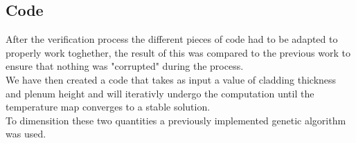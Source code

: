 \subsection{Code}
After the verification process the different pieces of code had to be adapted to properly work toghether, 
the result of this was compared to the previous work to ensure that nothing was "corrupted" during the process. \\
We have then created a code that takes as input a value of cladding thickness and plenum height 
and will iterativly undergo the computation until the temperature map converges to a stable solution. \\
To dimensition these two quantities a previously implemented genetic algorithm was used. \\